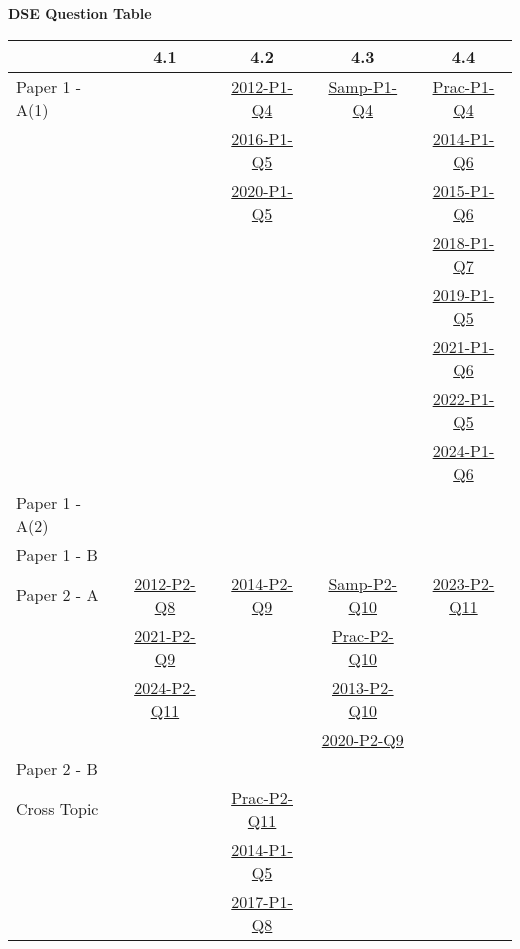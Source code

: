 \documentclass[12pt, a4paper]{article}
\begin{document}
\begin{absolutelynopagebreak}
\begin{center}
\textbf{DSE Question Table}
\end{center}
\begin{center}
\begin{tabular}{|l|c|c|c|c|}
\hline
        & 4.1 & 4.2 & 4.3 & 4.4 \\\hline
\hline
Paper 1 - A(1)&  & \hyperref[DSE2012-CoreP1-Q04]{2012-P1-Q4} & \hyperref[DSE2012S-CoreP1-Q04]{Samp-P1-Q4} & \hyperref[DSE2012P-CoreP1-Q04]{Prac-P1-Q4} \\
&  & \hyperref[DSE2016-CoreP1-Q05]{2016-P1-Q5} &  & \hyperref[DSE2014-CoreP1-Q06]{2014-P1-Q6} \\
&  & \hyperref[DSE2020-CoreP1-Q05]{2020-P1-Q5} &  & \hyperref[DSE2015-CoreP1-Q06]{2015-P1-Q6} \\
&  &  &  & \hyperref[DSE2018-CoreP1-Q07]{2018-P1-Q7} \\
&  &  &  & \hyperref[DSE2019-CoreP1-Q05]{2019-P1-Q5} \\
&  &  &  & \hyperref[DSE2021-CoreP1-Q06]{2021-P1-Q6} \\
&  &  &  & \hyperref[DSE2022-CoreP1-Q05]{2022-P1-Q5} \\
&  &  &  & \hyperref[DSE2024-CoreP1-Q06]{2024-P1-Q6} \\
\hline
Paper 1 - A(2)&  &  &  &  \\
\hline
Paper 1 - B&  &  &  &  \\
\hline
\hline
Paper 2 - A& \hyperref[DSE2012-CoreP2-Q08]{2012-P2-Q8} & \hyperref[DSE2014-CoreP2-Q09]{2014-P2-Q9} & \hyperref[DSE2012S-CoreP2-Q10]{Samp-P2-Q10} & \hyperref[DSE2023-CoreP2-Q11]{2023-P2-Q11} \\
& \hyperref[DSE2021-CoreP2-Q09]{2021-P2-Q9} &  & \hyperref[DSE2012P-CoreP2-Q10]{Prac-P2-Q10} &  \\
& \hyperref[DSE2024-CoreP2-Q11]{2024-P2-Q11} &  & \hyperref[DSE2013-CoreP2-Q10]{2013-P2-Q10} &  \\
&  &  & \hyperref[DSE2020-CoreP2-Q09]{2020-P2-Q9} &  \\
\hline
Paper 2 - B&  &  &  &  \\
\hline
\hline
Cross Topic&  & \hyperref[DSE2012P-CoreP2-Q11]{Prac-P2-Q11} &  &  \\
&  & \hyperref[DSE2014-CoreP1-Q05]{2014-P1-Q5} &  &  \\
&  & \hyperref[DSE2017-CoreP1-Q08]{2017-P1-Q8} &  &  \\
\hline
\end{tabular}
\end{center}
\end{absolutelynopagebreak}
\end{document}
